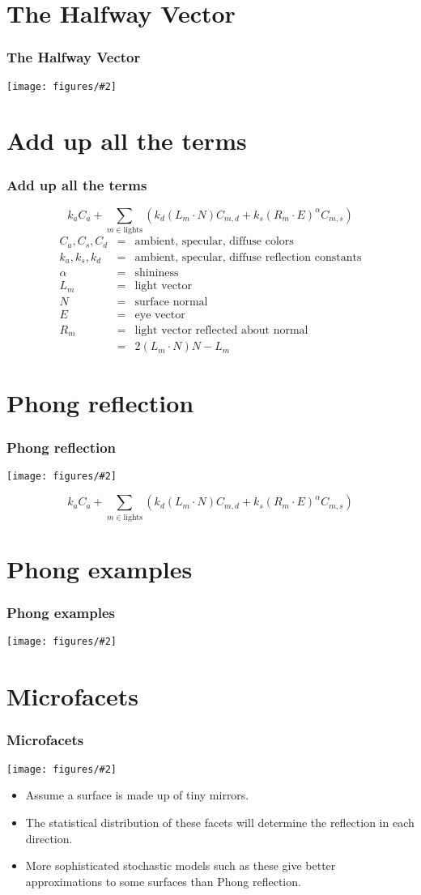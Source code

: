 \documentclass[slidestop,xcolor=pst]{beamer}
\newcommand{\mygraphc}[2]{\centerline{\texttt{[image: figures/\#2]}}}
\newcommand{\sect}[1]{
\section{#1}
\begin{frame}[fragile]\frametitle{#1}
}
\begin{document}
\sect{The Halfway Vector}
\mygraphc{}{Blinn_phong_comparison.png}
\end{frame}




\sect{Add up all the terms}
\[
k_a C_a + \sum_{m \in \mbox{lights}} (k_d(L_m\cdot N)C_{m,d}
                + k_s(R_m\cdot E)^\alpha C_{m,s})
\]
\begin{eqnarray*}
C_a,C_s,C_d &=& \mbox{ambient, specular, diffuse colors}\\
k_a,k_s,k_d &=& \mbox{ambient, specular, diffuse reflection constants}\\
\alpha &=& \mbox{shininess}\\
L_m &=& \mbox{light vector}\\
N &=& \mbox{surface normal}\\
E &=& \mbox{eye vector}\\
R_m &=& \mbox{light vector reflected about normal}\\
  &=& 2(L_m\cdot N)N - L_m
\end{eqnarray*}
\end{frame}


\sect{Phong reflection}
\mygraphc{}{Phong_components_version_4.png}
\[
k_a C_a + \sum_{m \in \mbox{lights}} (k_d(L_m\cdot N)C_{m,d}
                + k_s(R_m\cdot E)^\alpha C_{m,s})
\]
\end{frame}


\sect{Phong examples}
\mygraphc{0.8}{phongexamples.png}
\end{frame}


\sect{Microfacets}

\mygraphc{.5}{microfacets.png}
\begin{itemize}
\item Assume a surface is made up of tiny mirrors.
\item The statistical distribution of these facets will determine the
  reflection in each direction.
\item More sophisticated stochastic models
  such as these give better approximations to some
  surfaces than Phong reflection.
\end{itemize}

\end{frame}
\end{document}
